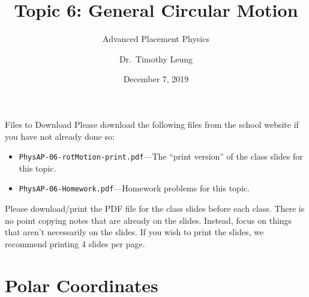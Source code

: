 \documentclass[12pt,compress,aspectratio=169]{beamer}
\title{Topic 6: General Circular Motion}
\subtitle{Advanced Placement Physics}
\author[TML]{Dr.\ Timothy Leung}
\institute{Olympiads School}
\date{December 7, 2019}
\begin{document}
\begin{frame}
  \maketitle
\end{frame}


\begin{frame}{Files to Download}
  Please download the following files from the school website if you have not
  already done so:
  \begin{itemize}
  \item\texttt{PhysAP-06-rotMotion-print.pdf}---The ``print version'' of the
    class slides for this topic.
  \item\texttt{PhysAP-06-Homework.pdf}---Homework problems for this topic.
  \end{itemize}
  \vspace{.1in}Please download/print the PDF file for the class slides before
  each class. There is no point copying notes that are already on the slides.
  Instead, focus on things that aren't necessarily on the slides. If you wish
  to print the slides, we recommend printing 4 slides per page.
\end{frame}



\section{Polar Coordinates}
\end{document}
